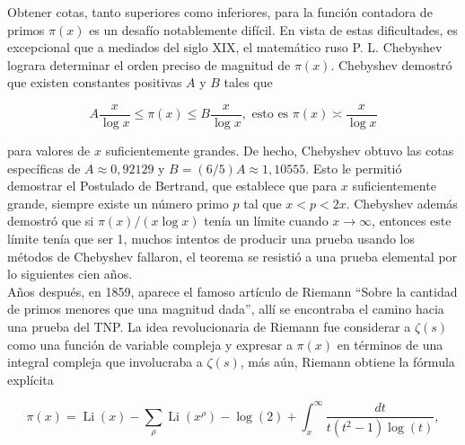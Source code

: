 
\thispagestyle{empty}
\vspace{-0.7cm}


Obtener cotas, tanto superiores como inferiores, para la función contadora de primos $\pi(x)$ es un desafío notablemente difícil. En vista de estas dificultades, es excepcional que a mediados del siglo XIX, el matemático ruso P. L. Chebyshev lograra determinar el orden preciso de magnitud de $\pi(x)$. Chebyshev demostró que existen constantes positivas $A$ y $B$ tales que

$$
A \frac{x}{\log x} \leq \pi(x) \leq B \frac{x}{\log x}, \text{ esto es } \pi(x)\asymp \frac{x}{\log x}
$$


para valores de $x$ suficientemente grandes. De hecho, Chebyshev obtuvo las cotas específicas de $A\approx 0,92129$ y $B=(6/5) A \approx 1,10555$. Esto le permitió demostrar el Postulado de Bertrand, que establece que para $x$ suficientemente grande, siempre existe un número primo $p$ tal que $x<p<2 x$. Chebyshev además demostró que si $\pi(x)/(x\log x)$ tenía un límite cuando $x\to \infty$, entonces este límite tenía que ser 1, muchos intentos de producir una prueba usando los métodos de Chebyshev fallaron, el teorema se resistió a una prueba elemental por lo siguientes cien años.\\

Años después, en 1859, aparece el famoso artículo de Riemann ``Sobre la cantidad de primos menores que una magnitud dada'', allí se encontraba el camino hacia una prueba del TNP. La idea revolucionaria de Riemann fue considerar a $\zeta(s)$ como una función de variable compleja y expresar a $\pi(x)$ en términos de una integral compleja que involucraba a $\zeta(s)$, más aún, Riemann obtiene la fórmula explícita

$$\pi(x)=\operatorname{Li}(x)-\sum_\rho \operatorname{Li}\left(x^\rho\right)-\log (2)+\int_x^{\infty} \frac{d t}{t\left(t^2-1\right) \log (t)},$$

